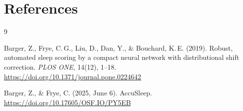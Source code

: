 \documentclass[12pt,a4paper]{article}
\begin{document}
\section{References}

\begingroup
\renewcommand{\section}[2]{}  %

\begin{thebibliography}{9}

Barger, Z., Frye, C.\,G., Liu, D., Dan, Y., \& Bouchard, K.\,E. (2019).
Robust, automated sleep scoring by a compact neural network with distributional
shift correction.
\textit{PLOS ONE}, 14(12), 1--18.
\url{https://doi.org/10.1371/journal.pone.0224642}

Barger, Z., \& Frye, C. (2025, June 6).
AccuSleep.
\url{https://doi.org/10.17605/OSF.IO/PY5EB}

\end{thebibliography}
\endgroup
\end{document}
